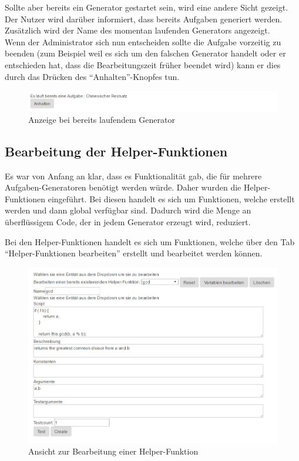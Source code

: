 Sollte aber bereits ein Generator gestartet sein, wird eine andere Sicht gezeigt. Der Nutzer wird darüber informiert, dass bereits Aufgaben generiert werden. Zusätzlich wird der Name des momentan laufenden Generators angezeigt.\\
Wenn der Administrator sich nun entscheiden sollte die Aufgabe vorzeitig zu beenden (zum Beispiel weil es sich um den falschen Generator handelt oder er entschieden hat, dass die Bearbeitungszeit früher beendet wird) kann er dies durch das Drücken des ``Anhalten''-Knopfes tun.


\begin{figure}[htp]     %
\centering
\includegraphics[width=1\textwidth]{bilder/TaskRunning} 
\caption[Anzeige bei bereits laufendem Generator]{Anzeige bei bereits laufendem Generator}
\end{figure}


\subsection{Bearbeitung der Helper-Funktionen} \label{EditGenerator}

Es war von Anfang an klar, dass es Funktionalität gab, die für mehrere Aufgaben-Generatoren benötigt werden würde. Daher wurden die Helper-Funktionen eingeführt. Bei diesen handelt es sich um Funktionen, welche erstellt werden und dann global verfügbar sind. Dadurch wird die Menge an überflüssigem Code, der in jedem Generator erzeugt wird, reduziert.

Bei den Helper-Funktionen handelt es sich um Funktionen, welche über den Tab ``Helper-Funktionen bearbeiten'' erstellt und bearbeitet werden können. \\

\begin{figure}[htp]     %
\centering
\includegraphics[width=1\textwidth]{bilder/EditHelper} 
\caption[Ansicht zur Bearbeitung einer Helper-Funktion]{Ansicht zur Bearbeitung einer Helper-Funktion}
\end{figure} 

